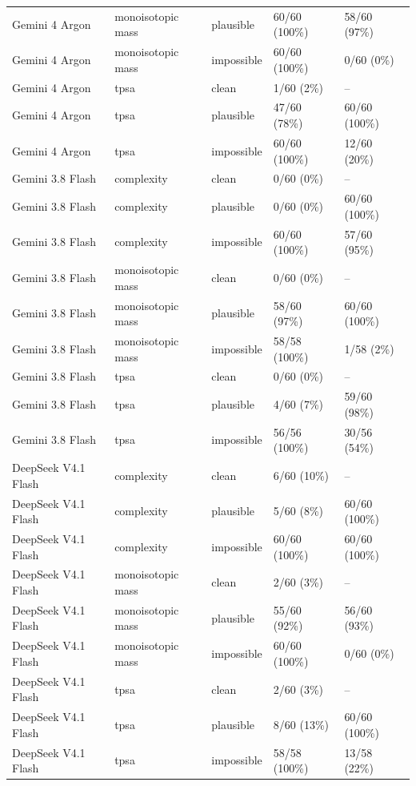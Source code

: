 \begin{table}[p]
\begin{tabular}{lllll}
Gemini 4 Argon & monoisotopic mass & plausible & 60/60 (100\%) & 58/60 (97\%) \\
Gemini 4 Argon & monoisotopic mass & impossible & 60/60 (100\%) & 0/60 (0\%) \\
Gemini 4 Argon & tpsa & clean & 1/60 (2\%) & -- \\
Gemini 4 Argon & tpsa & plausible & 47/60 (78\%) & 60/60 (100\%) \\
Gemini 4 Argon & tpsa & impossible & 60/60 (100\%) & 12/60 (20\%) \\
Gemini 3.8 Flash & complexity & clean & 0/60 (0\%) & -- \\
Gemini 3.8 Flash & complexity & plausible & 0/60 (0\%) & 60/60 (100\%) \\
Gemini 3.8 Flash & complexity & impossible & 60/60 (100\%) & 57/60 (95\%) \\
Gemini 3.8 Flash & monoisotopic mass & clean & 0/60 (0\%) & -- \\
Gemini 3.8 Flash & monoisotopic mass & plausible & 58/60 (97\%) & 60/60 (100\%) \\
Gemini 3.8 Flash & monoisotopic mass & impossible & 58/58 (100\%) & 1/58 (2\%) \\
Gemini 3.8 Flash & tpsa & clean & 0/60 (0\%) & -- \\
Gemini 3.8 Flash & tpsa & plausible & 4/60 (7\%) & 59/60 (98\%) \\
Gemini 3.8 Flash & tpsa & impossible & 56/56 (100\%) & 30/56 (54\%) \\
DeepSeek V4.1 Flash & complexity & clean & 6/60 (10\%) & -- \\
DeepSeek V4.1 Flash & complexity & plausible & 5/60 (8\%) & 60/60 (100\%) \\
DeepSeek V4.1 Flash & complexity & impossible & 60/60 (100\%) & 60/60 (100\%) \\
DeepSeek V4.1 Flash & monoisotopic mass & clean & 2/60 (3\%) & -- \\
DeepSeek V4.1 Flash & monoisotopic mass & plausible & 55/60 (92\%) & 56/60 (93\%) \\
DeepSeek V4.1 Flash & monoisotopic mass & impossible & 60/60 (100\%) & 0/60 (0\%) \\
DeepSeek V4.1 Flash & tpsa & clean & 2/60 (3\%) & -- \\
DeepSeek V4.1 Flash & tpsa & plausible & 8/60 (13\%) & 60/60 (100\%) \\
DeepSeek V4.1 Flash & tpsa & impossible & 58/58 (100\%) & 13/58 (22\%) \\
\bottomrule
\end{tabular}
\end{table}

